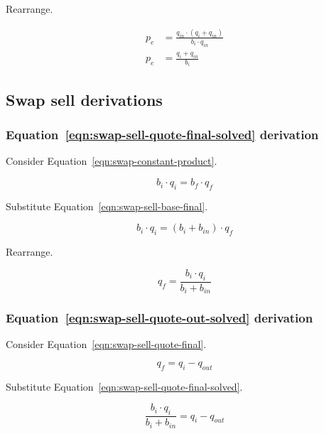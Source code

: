 \documentclass[table, twocolumn]{article}
\begin{document}
Rearrange.

\begin{align}
	p_e & = \frac{q_{in} \cdot (q_i + q_{in})}{b_i \cdot q_{in}} \nonumber \\
	p_e & = \frac{q_i + q_{in}}{b_i} \nonumber
\end{align}

\subsection{Swap sell derivations}\label{ssec:swap-sell-derivations}

\subsubsection{Equation~\ref{eqn:swap-sell-quote-final-solved} derivation}%
\label{sssec:equation-eqn-swap-sell-quote-final-solved-derivation}

Consider Equation~\ref{eqn:swap-constant-product}.

\begin{equation}
	b_i \cdot q_i = b_f \cdot q_f \nonumber
\end{equation}

Substitute Equation~\ref{eqn:swap-sell-base-final}.

\begin{equation}
	b_i \cdot q_i = (b_i + b_{in}) \cdot q_f \nonumber
\end{equation}

Rearrange.

\begin{equation}
	q_f = \frac{b_i \cdot q_i}{b_i + b_{in}} \nonumber
\end{equation}

\subsubsection{Equation~\ref{eqn:swap-sell-quote-out-solved} derivation}%
\label{sssec:equation-eqn-swap-sell-quote-out-solved-derivation}

Consider Equation~\ref{eqn:swap-sell-quote-final}.

\begin{equation}
	q_f = q_i - q_{out} \nonumber
\end{equation}

Substitute Equation~\ref{eqn:swap-sell-quote-final-solved}.

\begin{equation}
	\frac{b_i \cdot q_i}{b_i + b_{in}}= q_i - q_{out} \nonumber
\end{equation}
\end{document}
